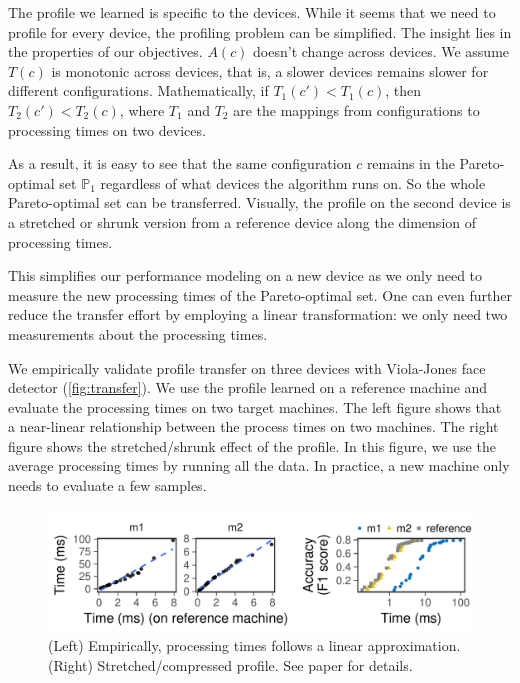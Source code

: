 The profile we learned is specific to the devices. While it seems that we need
to profile for every device, the profiling problem can be simplified. The
insight lies in the properties of our objectives. $A(c)$ doesn't change across
devices. We assume $T(c)$ is monotonic across devices, that is, a slower devices
remains slower for different configurations. Mathematically, if
$T_1(c') < T_1(c)$, then $T_2(c') < T_2(c)$, where $T_1$ and $T_2$ are the
mappings from configurations to processing times on two devices.

As a result, it is easy to see that the same configuration $c$ remains in the
Pareto-optimal set $\mathbb{P}_1$ regardless of what devices the algorithm runs
on. So the whole Pareto-optimal set can be transferred. Visually, the profile on
the second device is a stretched or shrunk version from a reference device along
the dimension of processing times.

This simplifies our performance modeling on a new device as we only need to
measure the new processing times of the Pareto-optimal set. One can even further
reduce the transfer effort by employing a linear transformation: we only need
two measurements about the processing times.

We empirically validate profile transfer on three devices with Viola-Jones face
detector (\autoref{fig:transfer}). We use the profile learned on a reference
machine and evaluate the processing times on two target machines. The left
figure shows that a near-linear relationship between the process times on two
machines. The right figure shows the stretched/shrunk effect of the profile. In
this figure, we use the average processing times by running all the data. In
practice, a new machine only needs to evaluate a few samples.

\begin{figure}
  \centering
  \includegraphics[width=0.9\linewidth]{figures/serving-cross-platform.pdf}
  \caption{(Left) Empirically, processing times follows a linear
    approximation. (Right) Stretched/compressed profile. See paper for
    details.}
  \label{fig:transfer}
\end{figure}

